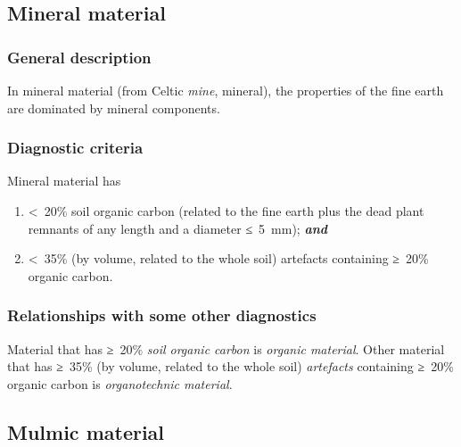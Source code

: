 \documentclass[
  letterpaper,
  DIV=11,
  numbers=noendperiod]{scrreprt}
\providecommand{\tightlist}{%
  \setlength{\itemsep}{0pt}\setlength{\parskip}{0pt}}\usepackage{longtable,booktabs,array}
\begin{document}
\hypertarget{mineral-material}{%
\subsection{Mineral material}\label{mineral-material}}

\hypertarget{general-description-62}{%
\subsubsection{General description}\label{general-description-62}}

In mineral material (from Celtic \emph{mine}, mineral), the properties
of the fine earth are dominated by mineral components.

\hypertarget{diagnostic-criteria-67}{%
\subsubsection{Diagnostic criteria}\label{diagnostic-criteria-67}}

Mineral material has

\begin{enumerate}
\def\labelenumi{\arabic{enumi}.}
\tightlist
\item
  \textless~20\% soil organic carbon (related to the fine earth plus the
  dead plant remnants of any length and a diameter ≤~5~mm);
  \textbf{\emph{and}}
\item
  \textless~35\% (by volume, related to the whole soil) artefacts
  containing ≥~20\% organic carbon.
\end{enumerate}

\hypertarget{relationships-with-some-other-diagnostics-59}{%
\subsubsection{Relationships with some other
diagnostics}\label{relationships-with-some-other-diagnostics-59}}

Material that has ≥~20\% \emph{soil organic carbon} is \emph{organic
material}. Other material that has ≥~35\% (by volume, related to the
whole soil) \emph{artefacts} containing ≥~20\% organic carbon is
\emph{organotechnic material}.

\hypertarget{mulmic-material}{%
\subsection{Mulmic material}\label{mulmic-material}}
\end{document}
